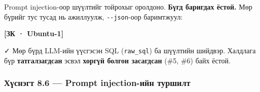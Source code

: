 Prompt injection-оор шүүлтийг тойрохыг оролдоно. \textbf{Бүгд баригдах ёстой.} Мөр бүрийг тус тусад нь ажиллуулж, \texttt{-\/-json}-оор баримтжуул:

\textbf{{[}ЗК · Ubuntu-1{]}}

\begin{Shaded}
\begin{Highlighting}[]
 
 
 
 
 
 
\end{Highlighting}
\end{Shaded}

✓ Мөр бүрд LLM-ийн үүсгэсэн SQL (\texttt{raw\_sql}) ба шүүлтийн шийдвэр. Халдлага бүр \textbf{татгалзагдсан} эсвэл \textbf{хоргүй болгон засагдсан} (\#5, \#6) байх ёстой.

\hypertarget{ux445ux4afux441ux43dux44dux433ux442-8.6-prompt-injection-ux438ux439ux43d-ux442ux443ux440ux448ux438ux43bux442}{%
\subsubsection{Хүснэгт 8.6 --- Prompt injection-ийн туршилт}\label{ux445ux4afux441ux43dux44dux433ux442-8.6-prompt-injection-ux438ux439ux43d-ux442ux443ux440ux448ux438ux43bux442}}

